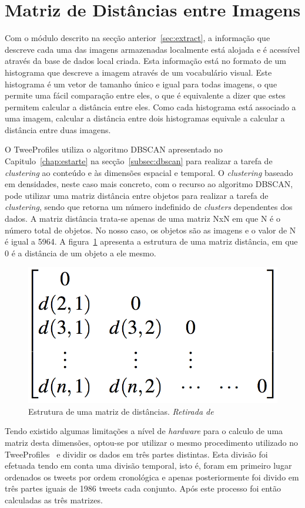 \section{Matriz de Distâncias entre Imagens}

Com o módulo descrito na secção anterior~\ref{sec:extract}, a informação que descreve cada uma das imagens armazenadas localmente está alojada e é acessível através da base de dados local criada. Esta informação está no formato de um histograma que descreve a imagem através de um vocabulário visual. Este histograma é um vetor de tamanho único e igual para todas imagens, o que permite uma fácil comparação entre eles, o que é equivalente a dizer que estes permitem calcular a distância entre eles. Como cada histograma está associado a uma imagem, calcular a distância entre dois histogramas equivale a calcular a distância entre duas imagens.

O TweeProfiles utiliza o algoritmo DBSCAN apresentado no Capitulo~\ref{chap:estarte} na secção~\ref{subsec:dbscan} para realizar a tarefa de \textit{clustering} ao conteúdo e às dimensões espacial e temporal. O \textit{clustering} baseado em densidades, neste caso mais concreto, com o recurso ao algoritmo DBSCAN, pode utilizar uma matriz distância entre objetos para realizar a tarefa de \textit{clustering}, sendo que retorna um número indefinido de \textit{clusters} dependentes dos dados. A matriz distância trata-se apenas de uma matriz NxN em que N é o número total de objetos. No nosso caso, os objetos são as imagens e o valor de N é igual a 5964. A figura~\ref{fig:matriz} apresenta a estrutura de uma matriz distância, em que 0 é a distância de um objeto a ele mesmo.

\begin{figure}[h]
\centering
\includegraphics[width=0.3\linewidth]{./figures/matrizdist}
\caption{Estrutura de uma matriz de distâncias. \textit{Retirada de}~\cite{Han2006}}
\label{fig:matriz}
\end{figure}

Tendo existido algumas limitações a nível de \textit{hardware} para o calculo de uma matriz desta dimensões, optou-se por utilizar o mesmo procedimento utilizado no TweeProfiles~\cite{Cunha2013} e dividir os dados em três partes distintas. Esta divisão foi efetuada tendo em conta uma divisão temporal, isto é, foram em primeiro lugar ordenados os tweets por ordem cronológica e apenas posteriormente foi divido em três partes iguais de 1986 tweets cada conjunto. Após este processo foi então calculadas as três matrizes.
 
